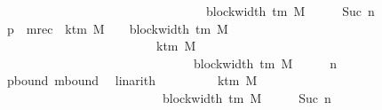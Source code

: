 \begin{isabellebody}
\ \ \ \ \ \ \ \ \ \ \ \ \ \ \ \ \ \ \ \ \ \ \ \ \ \ \ \ \ \ {\isacharasterisk}{\kern0pt}\ {\isacharparenleft}{\kern0pt}{}\ {\isacharasterisk}{\kern0pt}\ block{\isacharunderscore}{\kern0pt}width\ {\isacharparenleft}{\kern0pt}{\isasymGamma}{\isacharunderscore}{\kern0pt}tm\ M{\isacharparenright}{\kern0pt}\ {\isacharplus}{\kern0pt}\ {}{\isacharparenright}{\kern0pt}\ {\isacharplus}{\kern0pt}\ {}{\isacharparenright}{\kern0pt}\ {\isacharasterisk}{\kern0pt}\ Suc\ n{\isacharprime}{\kern0pt}{\isachardoublequoteclose}\isanewline
\ \ \isamarkupfalse%
\ {\isacharminus}{\kern0pt}\isanewline
\ \ \ \ \isamarkupfalse%
\ {\isachardoublequoteopen}p\ {\isacharplus}{\kern0pt}\ m{\isacharunderscore}{\kern0pt}rec\ {\isasymle}\ {\isacharparenleft}{\kern0pt}k{\isacharunderscore}{\kern0pt}tm\ M\ {\isacharasterisk}{\kern0pt}\ {\isacharparenleft}{\kern0pt}{}\ {\isacharasterisk}{\kern0pt}\ block{\isacharunderscore}{\kern0pt}width\ {\isacharparenleft}{\kern0pt}{\isasymGamma}{\isacharunderscore}{\kern0pt}tm\ M{\isacharparenright}{\kern0pt}\ {\isacharplus}{\kern0pt}\ {}{\isacharparenright}{\kern0pt}\ {\isacharplus}{\kern0pt}\ {}{\isacharparenright}{\kern0pt}\isanewline
\ \ \ \ \ \ \ \ \ \ \ \ \ \ \ \ \ \ \ \ \ \ \ \ {\isacharplus}{\kern0pt}\ {\isacharparenleft}{\kern0pt}k{\isacharunderscore}{\kern0pt}tm\ M\isanewline
\ \ \ \ \ \ \ \ \ \ \ \ \ \ \ \ \ \ \ \ \ \ \ \ \ \ \ \ {\isacharasterisk}{\kern0pt}\ {\isacharparenleft}{\kern0pt}{}\ {\isacharasterisk}{\kern0pt}\ block{\isacharunderscore}{\kern0pt}width\ {\isacharparenleft}{\kern0pt}{\isasymGamma}{\isacharunderscore}{\kern0pt}tm\ M{\isacharparenright}{\kern0pt}\ {\isacharplus}{\kern0pt}\ {}{\isacharparenright}{\kern0pt}\ {\isacharplus}{\kern0pt}\ {}{\isacharparenright}{\kern0pt}\ {\isacharasterisk}{\kern0pt}\ n{\isacharprime}{\kern0pt}{\isachardoublequoteclose}\isanewline
\ \ \ \ \ \ \isamarkupfalse%
\ pbound\ mbound\ \isamarkupfalse%
\ linarith\isanewline
\ \ \ \ \isamarkupfalse%
\ \isamarkupfalse%
\ {\isachardoublequoteopen}{\isasymdots}\ {\isacharequal}{\kern0pt}\ {\isacharparenleft}{\kern0pt}k{\isacharunderscore}{\kern0pt}tm\ M\isanewline
\ \ \ \ \ \ \ \ \ \ \ \ \ \ \ \ \ \ \ \ \ \ \ {\isacharasterisk}{\kern0pt}\ {\isacharparenleft}{\kern0pt}{}\ {\isacharasterisk}{\kern0pt}\ block{\isacharunderscore}{\kern0pt}width\ {\isacharparenleft}{\kern0pt}{\isasymGamma}{\isacharunderscore}{\kern0pt}tm\ M{\isacharparenright}{\kern0pt}\ {\isacharplus}{\kern0pt}\ {}{\isacharparenright}{\kern0pt}\ {\isacharplus}{\kern0pt}\ {}{\isacharparenright}{\kern0pt}\ {\isacharasterisk}{\kern0pt}\ Suc\ n{\isacharprime}{\kern0pt}{\isachardoublequoteclose}\ \isamarkupfalse%

\end{isabellebody}
